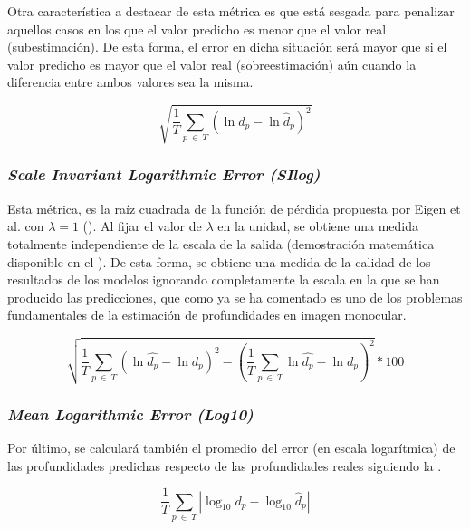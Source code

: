 Otra característica a destacar de esta métrica es que está sesgada para penalizar aquellos casos en los que el valor predicho es menor que el valor real (subestimación). De esta forma, el error en dicha situación será mayor que si el valor predicho es mayor que el valor real (sobreestimación) aún cuando la diferencia entre ambos valores sea la misma.

\begin{equation}
\label{eqn:rmselog}
\sqrt{\frac{1}{T}\sum_{p\ \in\ T} (\ln{d_p} - \ln{\hat{d}_p})^2}
\end{equation}

\subsubsection{\textit{Scale Invariant Logarithmic Error (SIlog)}}
Esta métrica, es la raíz cuadrada de la función de pérdida propuesta por Eigen et al. \cite{eigen-multi-scale} con $\lambda = 1$ (). Al fijar el valor de $\lambda$ en la unidad, se obtiene una medida totalmente independiente de la escala de la salida (demostración matemática disponible en el ). De esta forma, se obtiene una medida de la calidad de los resultados de los modelos ignorando completamente la escala en la que se han producido las predicciones, que como ya se ha comentado es uno de los problemas fundamentales de la estimación de profundidades en imagen monocular.

\begin{equation}
\label{eqn:silog}
\sqrt{
	\frac{1}{T} \sum_{p\ \in\ T} (\ln{\hat{d_p}} - \ln{d_p})^2
	-
	{\left(\frac{1}{T} \sum_{p\ \in\ T} \ln{\hat{d_p}} - \ln{d_p}\right)}^2
} * 100
\end{equation}

\subsubsection{\textit{Mean Logarithmic Error (Log10)}}
Por último, se calculará también el promedio del error (en escala logarítmica) de las profundidades predichas respecto de las profundidades reales siguiendo la .

\begin{equation}
\label{eqn:log10}
\frac{1}{T} \sum_{p\ \in\ T} |\log_{10}{d_p} - \log_{10}{\hat{d}_p}|
\end{equation}

